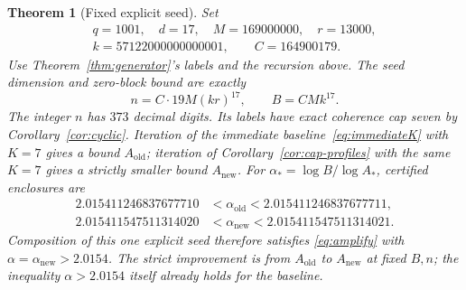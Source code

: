 \documentclass[11pt]{amsart}
\newtheorem{theorem}{Theorem}[section]
\theoremstyle{definition}
\theoremstyle{remark}
\newcommand{\old}{\mathrm{old}}
\newcommand{\new}{\mathrm{new}}
\begin{document}
\begin{theorem}[Fixed explicit seed]\label{thm:numerical}
Set
\begin{equation}\label{eq:fixed}
 \begin{gathered}
 q=1001,\quad d=17,\quad M=169000000,\quad r=13000,\\
 k=57122000000000001,\qquad C=164900179.
 \end{gathered}
\end{equation}
Use Theorem~\ref{thm:generator}'s labels and the recursion above.
The seed dimension and zero-block bound are exactly
\begin{equation}\label{eq:fixednb}
 n=C\cdot19M(kr)^{17},\qquad B=CMk^{17}.
\end{equation}
The integer $n$ has $373$ decimal digits. Its labels have exact coherence
cap seven by Corollary~\ref{cor:cyclic}. Iteration of the immediate
baseline~\eqref{eq:immediateK} with $K=7$ gives a bound $A_\old$;
iteration of Corollary~\ref{cor:cap-profiles} with the same $K=7$ gives
a strictly smaller bound $A_\new$.
For $\alpha_*=\log B/\log A_*$, certified enclosures are
\begin{align}
 2.015411246837677710&<\alpha_\old<2.015411246837677711,
 \label{eq:oldinterval}\\
 2.015411547511314020&<\alpha_\new<2.015411547511314021.
 \label{eq:newinterval}
\end{align}
Composition of this one explicit seed therefore satisfies
\eqref{eq:amplify} with $\alpha=\alpha_\new>2.0154$.
The strict improvement is from $A_\old$ to $A_\new$ at fixed $B,n$;
the inequality $\alpha>2.0154$ itself already holds for the baseline.
\end{theorem}
\end{document}
